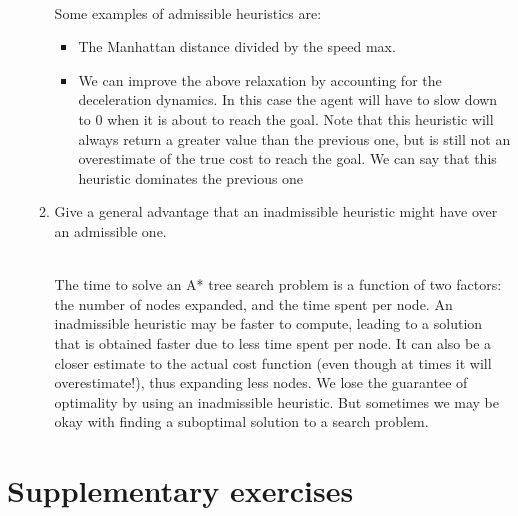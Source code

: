 \documentclass[9pt,a4paper]{extarticle}
\newenvironment{solution}
    {%
    \color{red}
    }
    { 
    \color{black}
    }
\begin{document}
\begin{itemize}
\begin{enumerate}
        \begin{solution}\\
        Some examples of admissible heuristics are:
        \begin{itemize}
            \item The Manhattan distance divided by the speed max.
            \item We can improve the above relaxation by accounting for the deceleration dynamics. In this case the
agent will have to slow down to 0 when it is about to reach the goal. Note that this heuristic will
always return a greater value than the previous one, but is still not an overestimate of the true cost
to reach the goal. We can say that this heuristic dominates the previous one
        \end{itemize}
        \end{solution}
        \item Give a general advantage that an inadmissible heuristic might have over an admissible one.
        \begin{solution}
        \\
        The time to solve an A* tree search problem is a function of two factors: the number of nodes expanded,
and the time spent per node.
An inadmissible heuristic may be faster to compute, leading to a solution that is obtained faster due to
less time spent per node. It can also be a closer estimate to the actual cost function (even though at times
it will overestimate!), thus expanding less nodes.
We lose the guarantee of optimality by using an inadmissible heuristic. But sometimes we may be okay
with finding a suboptimal solution to a search problem.
        \end{solution}
    \end{enumerate}
\end{itemize}
\section*{Supplementary exercises}
\end{document}
